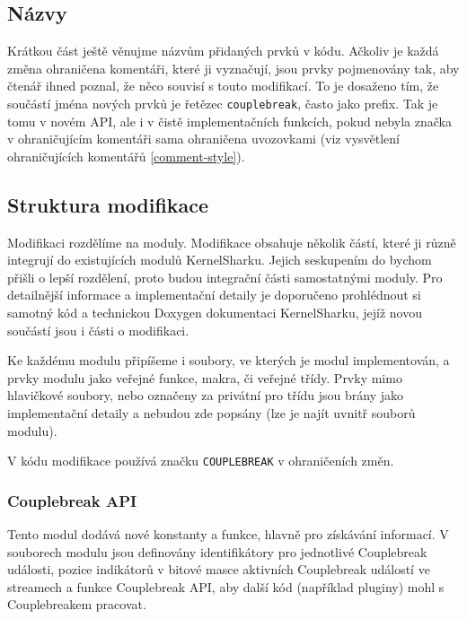 \subsection*{Názvy}
Krátkou část ještě věnujme názvům přidaných prvků v kódu. Ačkoliv je každá změna ohraničena komentáři, které ji vyznačují, jsou prvky pojmenovány tak, aby čtenář ihned poznal, že něco souvisí s touto modifikací. To je dosaženo tím, že součástí jména nových prvků je řetězec \texttt{couplebreak}, často jako prefix. Tak je tomu v novém API, ale i v čistě implementačních funkcích, pokud nebyla značka v ohraničujícím komentáři sama ohraničena uvozovkami (viz vysvětlení ohraničujících komentářů \ref{comment-style}).

\subsection{Struktura modifikace}

Modifikaci rozdělíme na moduly. Modifikace obsahuje několik částí, které ji různě integrují do existujících modulů KernelSharku. Jejich seskupením do  bychom přišli o lepší rozdělení, proto budou integrační části samostatnými moduly. Pro detailnější informace a implementační detaily je doporučeno prohlédnout si samotný kód a technickou Doxygen dokumentaci KernelSharku, jejíž novou součástí jsou i části o modifikaci.

Ke každému modulu připíšeme i soubory, ve kterých je modul implementován, a prvky modulu jako veřejné funkce, makra, či veřejné třídy. Prvky mimo hlavičkové soubory, nebo označeny za privátní pro třídu jsou brány jako implementační detaily a nebudou zde popsány (lze je najít uvnitř souborů modulu).

V kódu modifikace používá značku \texttt{COUPLEBREAK} v ohraničeních změn.

\subsubsection*{Couplebreak API}
Tento modul dodává nové konstanty a funkce, hlavně pro získávání informací. V souborech modulu jsou definovány identifikátory pro jednotlivé Couplebreak události, pozice indikátorů v bitové masce aktivních Couplebreak událostí ve streamech a funkce Couplebreak API, aby další kód (například pluginy) mohl s Couplebreakem pracovat.

